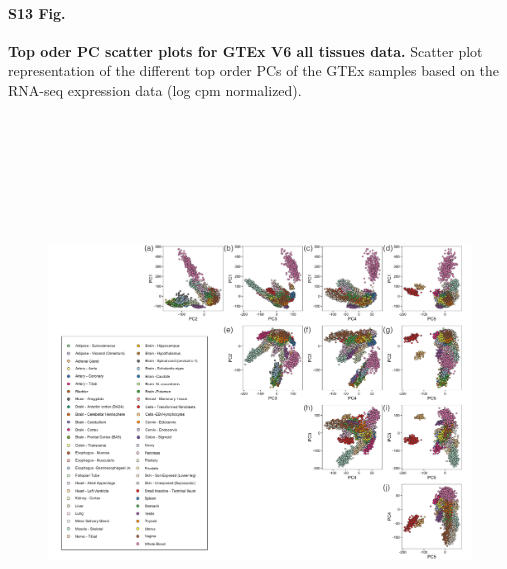 \documentclass[10pt,letterpaper]{article}
\begin{document}
\paragraph*{S13 Fig.}

\label{figS13}
{\bf Top oder PC scatter plots for GTEx V6 all tissues data.} Scatter plot representation of the different top order PCs of the GTEx samples based on the RNA-seq expression data (log cpm normalized).
\begin{figure}[ht]
\centering
\includegraphics[height=6in, width=6in]{../../plots/gtex-figures/gtex-high-pcs.pdf}
\end{figure}
\end{document}

